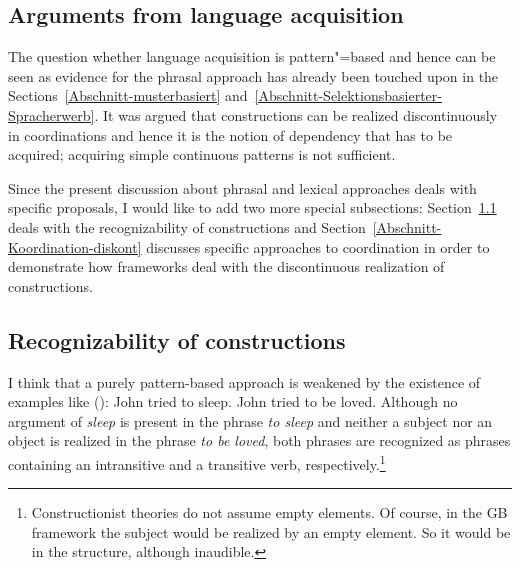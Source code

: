 \begin{exe}
\begin{xlist}[iv.]
\begin{exe}
\begin{xlist}[iv.]
\section{Arguments from language acquisition}
\label{sec-acquisition}

The question whether language acquisition is pattern"=based and hence can be seen as evidence for
the phrasal approach has already been touched upon in the Sections~\ref{Abschnitt-musterbasiert}
and~\ref{Abschnitt-Selektionsbasierter-Spracherwerb}. It was argued that constructions can be
realized discontinuously in coordinations and hence it is the notion of
dependency that has to be acquired; acquiring simple continuous patterns is not sufficient.

Since the present discussion about phrasal and lexical approaches deals with specific proposals, I would like
to add two more special subsections: Section~\ref{sec-recognizability-of-constructions} deals with
the recognizability of constructions and Section~\ref{Abschnitt-Koordination-diskont} discusses specific approaches to coordination
in order to demonstrate how frameworks deal with the discontinuous realization of constructions.


\subsection{Recognizability of constructions}
\label{sec-recognizability-of-constructions}
 
I think that a purely pattern-based approach is weakened by the existence of examples like ():
\eal
\ex John tried to sleep.
\ex John tried to be loved.
\zl
Although no argument of \emph{sleep} is present in the phrase \emph{to sleep} and neither a subject
nor an object is realized in the phrase \emph{to be loved}, both phrases are recognized as phrases
containing an intransitive and a transitive verb, respectively.\footnote{
Constructionist theories do not assume empty elements. Of course, in the GB framework the subject
would be realized by an empty element. So it would be in the structure, although inaudible.%
}  


\end{xlist}
\end{exe}
\end{xlist}
\end{exe}
